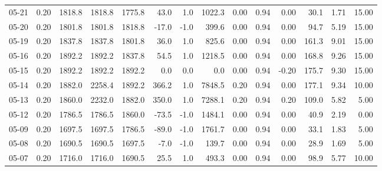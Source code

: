 \begin{threeparttable}
{\begin{tabular}{lrrrrrrrrrrrrr}
  05-21 &     0.20 & 1818.8 & 1818.8 & 1775.8 &       43.0 &                      1.0 &              1022.3 &       0.00 &      0.94 &           0.00 &             30.1 &            1.71 &                  15.00 \\
  05-20 &     0.20 & 1801.8 & 1801.8 & 1818.8 &      -17.0 &                     -1.0 &               399.6 &       0.00 &      0.94 &           0.00 &             94.7 &            5.19 &                  15.00 \\
  05-19 &     0.20 & 1837.8 & 1837.8 & 1801.8 &       36.0 &                      1.0 &               825.6 &       0.00 &      0.94 &           0.00 &            161.3 &            9.01 &                  15.00 \\
  05-16 &     0.20 & 1892.2 & 1892.2 & 1837.8 &       54.5 &                      1.0 &              1218.5 &       0.00 &      0.94 &           0.00 &            168.8 &            9.26 &                  15.00 \\
  05-15 &     0.20 & 1892.2 & 1892.2 & 1892.2 &        0.0 &                      0.0 &                 0.0 &       0.00 &      0.94 &          -0.20 &            175.7 &            9.30 &                  15.00 \\
  05-14 &     0.20 & 1882.0 & 2258.4 & 1892.2 &      366.2 &                      1.0 &              7848.5 &       0.20 &      0.94 &           0.00 &            177.1 &            9.34 &                  10.00 \\
  05-13 &     0.20 & 1860.0 & 2232.0 & 1882.0 &      350.0 &                      1.0 &              7288.1 &       0.20 &      0.94 &           0.20 &            109.0 &            5.82 &                   5.00 \\
  05-12 &     0.20 & 1786.5 & 1786.5 & 1860.0 &      -73.5 &                     -1.0 &              1484.1 &       0.00 &      0.94 &           0.00 &             40.9 &            2.19 &                   0.00 \\
  05-09 &     0.20 & 1697.5 & 1697.5 & 1786.5 &      -89.0 &                     -1.0 &              1761.7 &       0.00 &      0.94 &           0.00 &             33.1 &            1.83 &                   5.00 \\
  05-08 &     0.20 & 1690.5 & 1690.5 & 1697.5 &       -7.0 &                     -1.0 &               139.7 &       0.00 &      0.94 &           0.00 &             28.9 &            1.69 &                   5.00 \\
  05-07 &     0.20 & 1716.0 & 1716.0 & 1690.5 &       25.5 &                      1.0 &               493.3 &       0.00 &      0.94 &           0.00 &             98.9 &            5.77 &                  10.00 \\

\end{tabular}}
\end{threeparttable}
